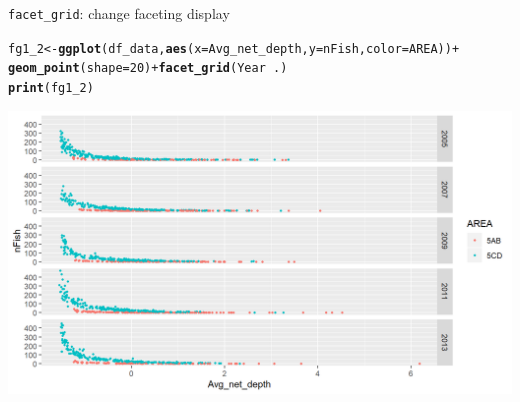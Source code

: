 \documentclass{beamer}\usepackage[]{graphicx}\usepackage[]{color}
\makeatletter
\newcommand{\hlnum}[1]{\textcolor[rgb]{0.686,0.059,0.569}{#1}}%
\newcommand{\hlopt}[1]{\textcolor[rgb]{0,0,0}{#1}}%
\newcommand{\hlstd}[1]{\textcolor[rgb]{0.345,0.345,0.345}{#1}}%
\newcommand{\hlkwb}[1]{\textcolor[rgb]{0.69,0.353,0.396}{#1}}%
\newcommand{\hlkwc}[1]{\textcolor[rgb]{0.333,0.667,0.333}{#1}}%
\newcommand{\hlkwd}[1]{\textcolor[rgb]{0.737,0.353,0.396}{\textbf{#1}}}%
\newenvironment{kframe}{%
 \def\at@end@of@kframe{}%
 \ifinner\ifhmode%
  \def\at@end@of@kframe{\end{minipage}}%
  \begin{minipage}{\columnwidth}%
 \fi\fi%
 \def\FrameCommand##1{\hskip\@totalleftmargin \hskip-\fboxsep
 \colorbox{shadecolor}{##1}\hskip-\fboxsep
     \hskip-\linewidth \hskip-\@totalleftmargin \hskip\columnwidth}%
 \MakeFramed {\advance\hsize-\width
   \@totalleftmargin\z@ \linewidth\hsize
   \@setminipage}}%
 {\par\unskip\endMakeFramed%
 \at@end@of@kframe}
\newenvironment{knitrout}{}{} %
\makeatother
\begin{document}
\begin{frame}[fragile]{\lstinline{facet_grid}: change faceting display}
\begin{knitrout}\footnotesize
{}\color{fgcolor}\begin{kframe}
\begin{alltt}
\hlstd{fg1_2} \hlkwb{<-} \hlkwd{ggplot}\hlstd{(df_data,} \hlkwd{aes}\hlstd{(}\hlkwc{x}\hlstd{=Avg_net_depth,} \hlkwc{y}\hlstd{=nFish,} \hlkwc{color}\hlstd{=AREA))} \hlopt{+}
  \hlkwd{geom_point}\hlstd{(}\hlkwc{shape}\hlstd{=}\hlnum{20}\hlstd{)} \hlopt{+} \hlkwd{facet_grid}\hlstd{(Year} \hlopt{~} \hlstd{.)}
\hlkwd{print}\hlstd{(fg1_2)}
\end{alltt}
\end{kframe}

{\centering \includegraphics[width=.9\linewidth]{figure/facet_grid_2-1} 

}



\end{knitrout}
\end{frame}
\end{document}
